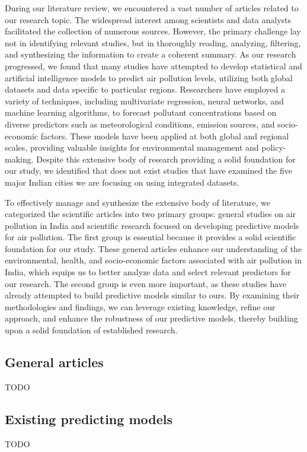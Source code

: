 \documentclass[twoside,11pt]{article}
\begin{document}
During our literature review, we encountered a vast number of articles related to our research topic. The widespread interest among scientists and data analysts facilitated the collection of numerous sources. However, the primary challenge lay not in identifying relevant studies, but in thoroughly reading, analyzing, filtering, and synthesizing the information to create a coherent summary. As our research progressed, we found that many studies have attempted to develop statistical and artificial intelligence models to predict air pollution levels, utilizing both global datasets and data specific to particular regions. Researchers have employed a variety of techniques, including multivariate regression, neural networks, and machine learning algorithms, to forecast pollutant concentrations based on diverse predictors such as meteorological conditions, emission sources, and socio-economic factors. These models have been applied at both global and regional scales, providing valuable insights for environmental management and policy-making. Despite this extensive body of research providing a solid foundation for our study, we identified that does not exist studies that have examined the five major Indian cities we are focusing on using integrated datasets.

To effectively manage and synthesize the extensive body of literature, we categorized the scientific articles into two primary groups: general studies on air pollution in India and scientific research focused on developing predictive models for air pollution. The first group is essential because it provides a solid scientific foundation for our study. These general articles enhance our understanding of the environmental, health, and socio-economic factors associated with air pollution in India, which equips us to better analyze data and select relevant predictors for our research. The second group is even more important, as these studies have already attempted to build predictive models similar to ours. By examining their methodologies and findings, we can leverage existing knowledge, refine our approach, and enhance the robustness of our predictive models, thereby building upon a solid foundation of established research.

\subsection{General articles}
TODO

\subsection{Existing predicting models}
TODO
\end{document}
